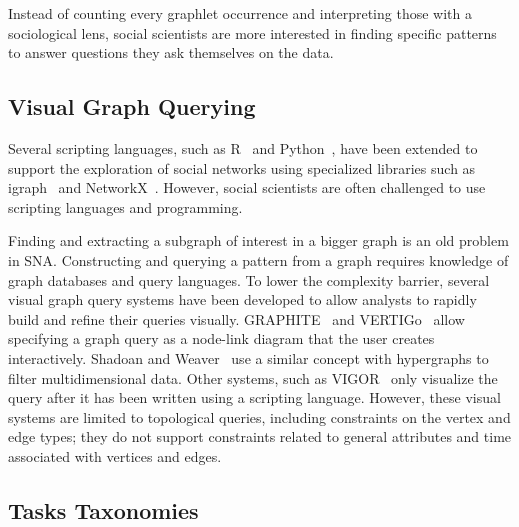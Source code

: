 Instead of counting every graphlet occurrence and interpreting those with a sociological lens, social scientists are more interested in finding specific patterns to answer questions they ask themselves on the data.




\subsection{Visual Graph Querying}

Several scripting languages, such as R~\cite{Rstat} and Python~\cite{Python}, have been extended to support the exploration of social networks using specialized libraries such as igraph~\cite{igraph} and NetworkX~\cite{NetworkX}. However, social scientists are often challenged to use scripting languages and programming.

Finding and extracting a subgraph of interest in a bigger graph
is an old problem in SNA. %
%
Constructing and querying a pattern from a graph requires knowledge of graph databases and query languages.
To lower the complexity barrier, several visual graph query systems have been developed to allow analysts to rapidly build and refine their queries visually. GRAPHITE~\cite{chauGRAPHITEVisualQuery2008} and VERTIGo~\cite{cuencaVERTIGoVisualPlatform2021} allow specifying a graph query as a node-link diagram that the user creates interactively. Shadoan and Weaver~\cite{shadoanVisualAnalysisHigherOrder2013} use a similar concept with hypergraphs to filter multidimensional data. Other systems, such as VIGOR~\cite{pientaVIGORInteractiveVisual2018} only visualize the query after it has been written using a scripting language. However, these visual systems are limited to topological queries, including constraints on the vertex and edge types; they do not support constraints related to general attributes and time associated with vertices and edges.

\iffalse
\subsection{Tasks Taxonomies}

